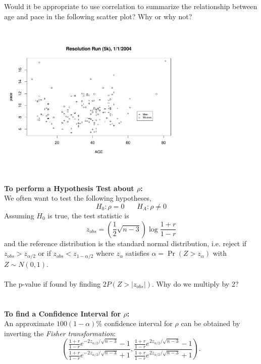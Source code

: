 Would it be appropriate to use correlation to summarize the relationship between age and pace in the following scatter plot?  Why or why not?
\begin{center}
\includegraphics[height=3in,width=3.5in]{res5k_nomodel.pdf}
\end{center}

\textbf{To perform a Hypothesis Test about $\rho$:}\\
We often want to test the following hypotheses,
$$H_0:\rho=0 ~~~~~~~~H_A: \rho\neq 0$$
Assuming $H_0$ is true, the test statistic is 
$$z_{obs}=\left(\frac{1}{2}\sqrt{n-3}\right)\log \frac{1+r}{1-r}$$
and the reference distribution is the standard normal distribution, i.e. reject if $z_{obs}>z_{\alpha/2}$ or if $z_{obs}<z_{1-\alpha/2}$ where $z_{\alpha}$ satisfies $\alpha=\Pr(Z>z_{\alpha})$ with $Z\sim N(0,1)$.\\~\\
The p-value if found by finding $2P(Z>|z_{obs}|)$.  Why do we multiply by 2?\\~\\~\\

\textbf{To find a Confidence Interval for $\rho$:}\\
An approximate $100(1-\alpha)\%$ confidence interval for $\rho$ can be obtained by inverting the {\em Fisher transformation}:
$$ \left(\frac{\frac{1+r}{1-r}e^{-2z_{\alpha/2}/\sqrt{n-3}}-1}{\frac{1+r}{1-r}e^{-2z_{\alpha/2}/\sqrt{n-3}}+1}, \frac{\frac{1+r}{1-r}e^{2z_{\alpha/2}/\sqrt{n-3}}-1}{\frac{1+r}{1-r}e^{2z_{\alpha/2}/\sqrt{n-3}}+1}\right).$$

